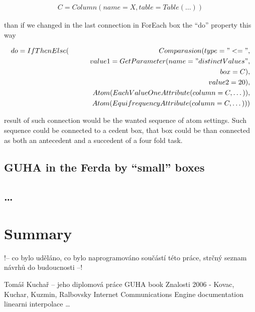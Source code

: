 \documentclass[a4paper,12pt]{book}
\begin{document}
\begin{eqnarray*}
C=Column(name=X, table=Table(\dots))
\end{eqnarray*}

than if we changed in the last connection in ForEach box the ``do'' property this way

\begin{eqnarray*}
do=IfThenElse(&&Comparasion(type="<=", \\&&\qquad value1=GetParameter(name="distinctValues", \\&&\qquad\qquad box=C), \\&&\qquad value2=20),\\&&Atom(EachValueOneAttribute(column=C,\dots)),\\&&Atom(EquifrequencyAttribute(column=C,\dots)))
\end{eqnarray*}

result of such connection would be the wanted sequence of atom settings. Such sequence could be connected to a cedent box, that box could be than connected as both an antecedent and a succedent of a four fold task.

\section{GUHA in the Ferda by ``small'' boxes}

\section{\dots}
\chapter{Summary}
!-- co bylo uděláno, co bylo naprogramováno součástí této práce, strčný seznam návrhů do budoucnosti --!



\begin{thebibliography}{thesisKuchar}
 Tomáš Kuchař -- jeho diplomová práce
 GUHA book
 Znalosti 2006 - Kovac, Kuchar, Kuzmin, Ralbovsky
 Internet Communications Engine documentation
 linearni interpolace 
 \dots
\end{thebibliography}
\end{document}
